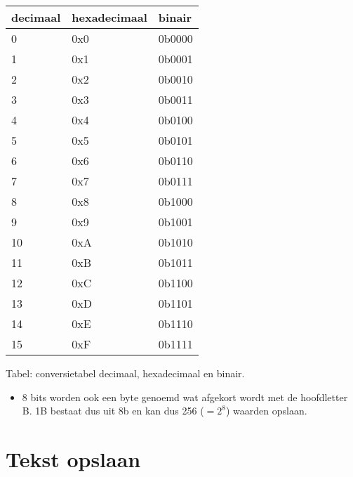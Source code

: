 \documentclass[]{memoir}
\providecommand{\tightlist}{%
  \setlength{\itemsep}{0pt}\setlength{\parskip}{0pt}}
\begin{document}
\begin{longtable}[]{@{}lll@{}}
\toprule
decimaal & hexadecimaal & binair\tabularnewline
\midrule
\endhead
0 & 0x0 & 0b0000\tabularnewline
1 & 0x1 & 0b0001\tabularnewline
2 & 0x2 & 0b0010\tabularnewline
3 & 0x3 & 0b0011\tabularnewline
4 & 0x4 & 0b0100\tabularnewline
5 & 0x5 & 0b0101\tabularnewline
6 & 0x6 & 0b0110\tabularnewline
7 & 0x7 & 0b0111\tabularnewline
8 & 0x8 & 0b1000\tabularnewline
9 & 0x9 & 0b1001\tabularnewline
10 & 0xA & 0b1010\tabularnewline
11 & 0xB & 0b1011\tabularnewline
12 & 0xC & 0b1100\tabularnewline
13 & 0xD & 0b1101\tabularnewline
14 & 0xE & 0b1110\tabularnewline
15 & 0xF & 0b1111\tabularnewline
\bottomrule
\end{longtable}

Tabel: conversietabel decimaal, hexadecimaal en binair.

\begin{itemize}
\tightlist
\item
  8 bits worden ook een byte genoemd wat afgekort wordt met de hoofdletter B. 1B bestaat dus uit 8b en kan dus 256 (\(=2^8\)) waarden opslaan.
\end{itemize}

\hypertarget{tekst-opslaan-1}{%
\section{Tekst opslaan}\label{tekst-opslaan-1}}
\end{document}
